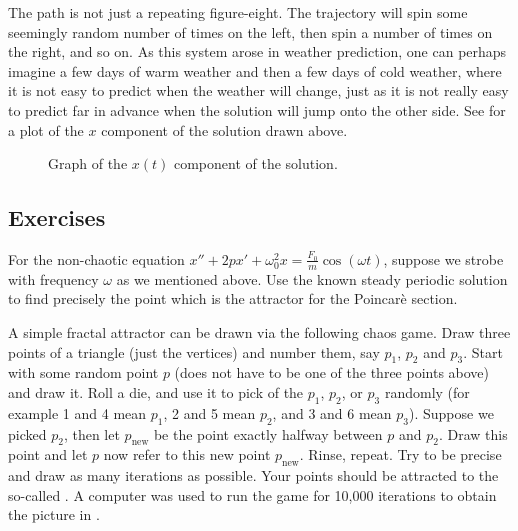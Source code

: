 The path is not just a repeating figure-eight.  The trajectory will spin some
seemingly random number of times on the left, then spin a number of times on
the right, and so on.  As this system arose in weather prediction, one can
perhaps imagine a few days of warm weather and then a few days of cold
weather, where it is not easy to predict when the weather will change,
just as it is not really easy to predict far in advance when the solution
will jump onto the other side.  See  for a
plot of the $x$ component of the solution drawn above.

\begin{figure}[h!t]
\capstart
\begin{center}
\caption{Graph of the $x(t)$ component of the solution.
\label{nlin:lorenz-graphx}}
\end{center}
\end{figure}

\subsection{Exercises}

\begin{exercise}
For the non-chaotic equation
$x''+2p x' + \omega_0^2 x = \frac{F_0}{m} \cos (\omega t)$, suppose we
strobe with frequency $\omega$ as we mentioned above.  Use the known
steady periodic solution to find precisely the point which is the attractor
for the Poincar\`e section.
\end{exercise}

\begin{exercise}[project]
A simple fractal attractor can be drawn via the following chaos game.  Draw three
points of a triangle (just the vertices) and number them, say $p_1$, $p_2$
and $p_3$.  Start with some
random point $p$ (does not have to be one of the three points above) and
draw it.  Roll a die, and use it to pick of the $p_1$, $p_2$, or $p_3$
randomly (for example 1 and 4 mean $p_1$, 2 and 5 mean $p_2$, and 3 and 6
mean $p_3$).  Suppose we picked $p_2$, then let $p_{\text{new}}$ be the
point exactly halfway between $p$ and $p_2$.  Draw this point and let $p$
now refer to this new point $p_{\text{new}}$.  Rinse, repeat.  Try to be
precise and draw as many iterations as possible.  Your points should be
attracted to the so-called \emph{}.  A computer
was used to run the game for 10,000 iterations to obtain the picture in
.
\end{exercise}

